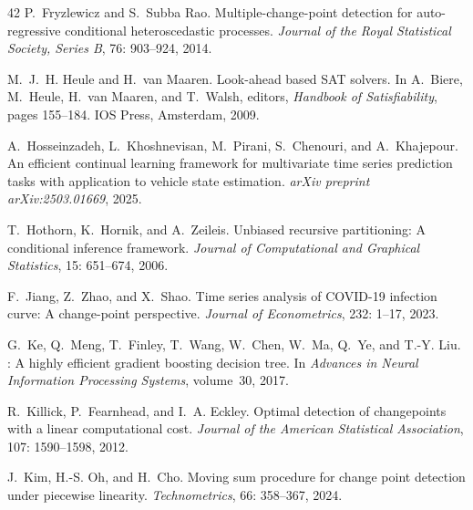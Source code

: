\documentclass[12pt, a4paper]{article}
\begin{document}
\begin{thebibliography}{42}
P.~Fryzlewicz and S.~{Subba Rao}.
\newblock Multiple-change-point detection for auto-regressive conditional
  heteroscedastic processes.
\newblock \emph{Journal of the Royal Statistical Society, Series B},
  76: 903--924, 2014.

M.~J.~H. Heule and H.~van Maaren.
\newblock Look-ahead based {SAT} solvers.
\newblock In A.~Biere, M.~Heule, H.~van Maaren, and T.~Walsh, editors,
  \emph{Handbook of Satisfiability}, pages 155--184. IOS Press, Amsterdam,
  2009.

A.~Hosseinzadeh, L.~Khoshnevisan, M.~Pirani, S.~Chenouri, and A.~Khajepour.
\newblock An efficient continual learning framework for multivariate time
  series prediction tasks with application to vehicle state estimation.
\newblock \emph{arXiv preprint arXiv:2503.01669}, 2025.

T.~Hothorn, K.~Hornik, and A.~Zeileis.
\newblock Unbiased recursive partitioning: A conditional inference framework.
\newblock \emph{Journal of Computational and Graphical Statistics},
  15: 651--674, 2006.

F.~Jiang, Z.~Zhao, and X.~Shao.
\newblock Time series analysis of {COVID-19} infection curve: {A} change-point
  perspective.
\newblock \emph{Journal of Econometrics}, 232: 1--17, 2023.

G.~Ke, Q.~Meng, T.~Finley, T.~Wang, W.~Chen, W.~Ma, Q.~Ye, and T.-Y. Liu.
: A highly efficient gradient boosting decision tree.
\newblock In \emph{Advances in Neural Information Processing Systems},
  volume~30, 2017.

R.~Killick, P.~Fearnhead, and I.~A. Eckley.
\newblock Optimal detection of changepoints with a linear computational cost.
\newblock \emph{Journal of the American Statistical Association}, 107:
  1590--1598, 2012.

J.~Kim, H.-S. Oh, and H.~Cho.
\newblock Moving sum procedure for change point detection under piecewise
  linearity.
\newblock \emph{Technometrics}, 66: 358--367, 2024{}.


\end{thebibliography}
\end{document}
